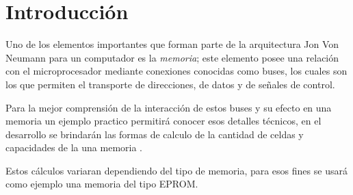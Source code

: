 \documentclass[../Main]{subfiles}
\begin{document}
    \chapter{Introducción}
        Uno de los elementos importantes que forman parte de la arquitectura Jon Von Neumann para un computador es la \textit{memoria}; este elemento posee una relación con el microprocesador mediante conexiones conocidas como buses, los cuales son los que permiten el transporte de direcciones, de datos y de señales de control.
        \vspace{0.3cm}
        
        Para la mejor comprensión de la interacción de estos buses y su efecto en una memoria un ejemplo practico permitirá conocer esos detalles técnicos, en el desarrollo se brindarán las formas de calculo de la cantidad de celdas y capacidades de la una memoria \cite{documentoTarea1}.
        \vspace{0.3cm}
        
        Estos cálculos variaran dependiendo del tipo de memoria, para esos fines se usará como ejemplo una memoria del tipo EPROM.
\end{document}
